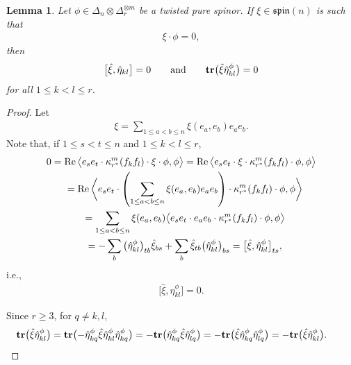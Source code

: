 \documentclass[pdftex]{sigma}
\newcommand{\tr}{\mbox{\bf tr}}
\numberwithin{equation}{section}
\newtheorem{Lemma}[Theorem]{Lemma}
\begin{document}
\begin{Lemma}\label{lemma: finding stabilizer 1} Let $\phi\in\Delta_n\otimes\Delta_r^{\otimes m}$ be a twisted pure spinor. If $\xi\in\mathfrak{spin}(n)$ is such that
\begin{gather*}\xi\cdot \phi=0,\end{gather*}
then
\begin{gather*}\big[\hat{\xi},\hat{\eta}_{kl}\big]=0\quad\quad\mbox{and}\quad\quad \tr\big(\hat{\xi}\hat{\eta}_{kl}^\phi\big)=0\end{gather*}
for all $1\leq k<l \leq r$.
\end{Lemma}
\begin{proof}
Let
\begin{gather*}\xi=\sum_{1\leq a<b\leq n} \xi(e_a,e_b)e_ae_b.\end{gather*}
Note that, if $1\leq s<t\leq n$ and $1\leq k<l\leq r $,
\begin{gather*}
 0 = \operatorname{Re}\big\langle e_se_t\cdot\kappa_{r^*}^m(f_kf_l)\cdot\xi\cdot\phi,\phi\big\rangle = \operatorname{Re}\big\langle e_se_t\cdot\xi\cdot\kappa_{r^*}^m(f_kf_l)\cdot\phi,\phi\big\rangle \\
 \hphantom{0}{} =
 \operatorname{Re}\bigg\langle e_se_t\cdot\left(\sum_{1\leq a<b\leq n} \xi(e_a,e_b)e_ae_b\right)\cdot\kappa_{r^*}^m(f_kf_l)\cdot\phi,\phi\bigg\rangle \\
\hphantom{0}{} =
 \sum_{1\leq a<b\leq n} \xi(e_a,e_b)\big\langle e_se_t\cdot e_ae_b\cdot\kappa_{r^*}^m(f_kf_l)\cdot\phi,\phi\big\rangle \\
\hphantom{0}{} =
 -\sum_{b} \big(\hat\eta_{kl}^\phi\big)_{tb}\hat\xi_{bs}
 +\sum_{b} \hat\xi_{tb}\big(\hat\eta_{kl}^\phi\big)_{bs}
=
 \big[\hat{\xi},\hat{\eta}_{kl}^\phi\big]_{ts},
\end{gather*}
i.e.,
\begin{gather*}\big[\hat{\xi},\hat{\eta}_{kl}^\phi\big]=0.\end{gather*}

Since $r\geq 3$, for $q\not= k,l$,
\begin{gather*}
 \tr\big(\hat{\xi}\hat{\eta}_{kl}^\phi\big) =
 \tr\big({-}\hat{\eta}_{kq}^\phi\hat{\xi}\hat{\eta}_{kl}^\phi\hat{\eta}_{kq}^\phi\big)
 =
 -\tr\big(\hat{\eta}_{kq}^\phi\hat{\xi}\hat{\eta}_{lq}^\phi\big)
 =
 -\tr\big(\hat{\xi}\hat{\eta}_{kq}^\phi\hat{\eta}_{lq}^\phi\big)
 =
 -\tr\big(\hat{\xi}\hat{\eta}_{kl}^\phi\big).\tag*{\qed}
\end{gather*}\renewcommand{\qed}{}
\end{proof}
\end{document}
